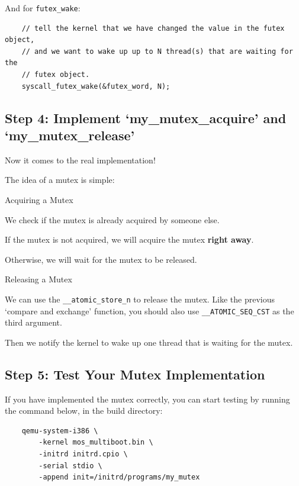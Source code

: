 And for \texttt{futex\_wake}:

\begin{verbatim}
    // tell the kernel that we have changed the value in the futex object,
    // and we want to wake up up to N thread(s) that are waiting for the
    // futex object.
    syscall_futex_wake(&futex_word, N);
\end{verbatim}

\subsection{Step 4: Implement `my\_mutex\_acquire' and `my\_mutex\_release'}

Now it comes to the real implementation!

The idea of a mutex is simple:

\begin{tip*}{Acquiring a Mutex}
    \item We check if the mutex is already acquired by someone else.
    \item If the mutex is not acquired, we will acquire the mutex \textbf{right away}.
    \item Otherwise, we will wait for the mutex to be released.
\end{tip*}

\begin{tip*}{Releasing a Mutex}
    \item We can use the \texttt{\_\_atomic\_store\_n} to release the mutex.
    Like the previous `compare and exchange' function, you should also use
    \texttt{\_\_ATOMIC\_SEQ\_CST} as the third argument.
    \item Then we notify the kernel to wake up one thread that is waiting for the mutex.
\end{tip*}

\subsection{Step 5: Test Your Mutex Implementation}

If you have implemented the mutex correctly, you can start testing by running the command
below, in the build directory:

\begin{verbatim}
    qemu-system-i386 \
        -kernel mos_multiboot.bin \
        -initrd initrd.cpio \
        -serial stdio \
        -append init=/initrd/programs/my_mutex
\end{verbatim}

